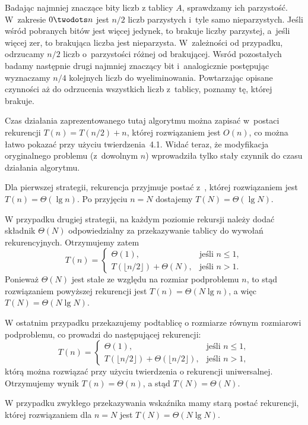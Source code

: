 Badając najmniej znaczące bity liczb z tablicy $A$, sprawdzamy ich parzystość. W~zakresie $0\twodots n$ jest $n/2$ liczb parzystych i~tyle samo nieparzystych. Jeśli wśród pobranych bitów jest więcej jedynek, to brakuje liczby parzystej, a~jeśli więcej zer, to brakująca liczba jest nieparzysta. W~zależności od przypadku, odrzucamy $n/2$ liczb o~parzystości różnej od brakującej. Wsród pozostałych badamy następnie drugi najmniej znaczący bit i~analogicznie postępując wyznaczamy $n/4$ kolejnych liczb do wyeliminowania. Powtarzając opisane czynności aż do odrzucenia wszystkich liczb z~tablicy, poznamy tę, której brakuje.

Czas działania zaprezentowanego tutaj algorytmu można zapisać w~postaci rekurencji $T(n)=T(n/2)+n$, której rozwiązaniem jest $O(n)$, co można łatwo pokazać przy użyciu twierdzenia~4.1. Widać teraz, że modyfikacja oryginalnego problemu (z~dowolnym $n$) wprowadziła tylko stały czynnik do czasu działania algorytmu.


\subproblem %
Dla pierwszej strategii, rekurencja przyjmuje postać z~, której rozwiązaniem jest $T(n)=\Theta(\lg n)$. Po przyjęciu $n=N$ dostajemy $T(N)=\Theta(\lg N)$.

W przypadku drugiej strategii, na każdym poziomie rekursji należy dodać składnik $\Theta(N)$ odpowiedzialny za przekazywanie tablicy do wywołań rekurencyjnych. Otrzymujemy zatem
\[
	T(n) = \begin{cases}
		\Theta(1), & \text{jeśli $n\le1$}, \\
		T(\lfloor n/2\rfloor)+\Theta(N), & \text{jeśli $n>1$}.
	\end{cases}
\]
Ponieważ $\Theta(N)$ jest stałe ze względu na rozmiar podproblemu $n$, to stąd rozwiązaniem powyższej rekurencji jest $T(n)=\Theta(N\lg n)$, a więc $T(N)=\Theta(N\lg N)$.

W ostatnim przypadku przekazujemy podtablicę o rozmiarze równym rozmiarowi podproblemu, co prowadzi do następującej rekurencji:
\[
    T(n) = \begin{cases}
		\Theta(1), & \text{jeśli $n\le1$}, \\
		T(\lfloor n/2\rfloor)+\Theta(\lfloor n/2\rfloor), & \text{jeśli $n>1$},
	\end{cases}
\]
którą można rozwiązać przy użyciu twierdzenia o rekurencji uniwersalnej. Otrzymujemy wynik $T(n)=\Theta(n)$, a stąd $T(N)=\Theta(N)$.

\subproblem %
W przypadku zwykłego przekazywania wskaźnika mamy starą postać rekurencji, której rozwiązaniem dla $n=N$ jest $T(N)=\Theta(N\lg N)$.

